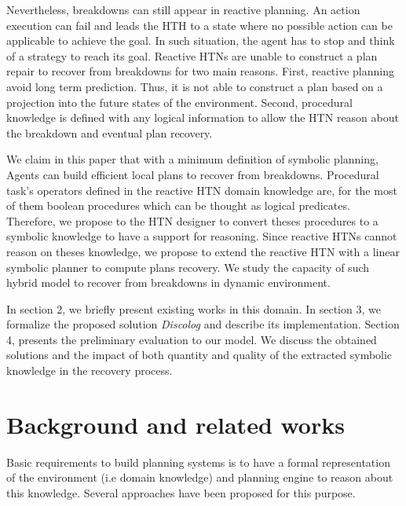 \documentclass[conference]{IEEEtran}
\begin{document}
	\par Nevertheless, breakdowns can still appear in reactive planning. An action execution can fail and leads the HTH to a state where no possible action can be applicable to achieve the goal. 	In such situation, the agent has to stop and think of a strategy to reach its goal.
 Reactive HTNs are unable to construct a plan repair to recover from breakdowns for two main reasons. First, reactive planning avoid long term prediction. Thus, it is not able to construct a plan based on a projection into the future states of the environment. Second, procedural knowledge is defined with any logical information to allow the HTN reason about the breakdown and  eventual plan recovery.
	
	\par We claim in this paper that with a minimum definition of symbolic planning, Agents can build efficient local plans to recover from breakdowns. Procedural task's operators defined in the reactive HTN domain knowledge are, for the most of them boolean procedures which can be thought as logical predicates. Therefore, we propose to the HTN designer to convert theses procedures to a symbolic knowledge to have a support for reasoning. Since reactive HTNs cannot reason on theses knowledge, we propose to extend the reactive HTN  with a linear symbolic planner  to compute plans recovery.  We study the capacity of such hybrid model to recover from breakdowns in dynamic environment. 
	
	\par In section 2, we briefly present existing works in this domain. In section 3, we formalize the proposed solution \textit{Discolog} and describe its implementation. Section 4, presents the preliminary evaluation to our model. We discuss the obtained solutions and the impact of both quantity and quality of the extracted symbolic knowledge in the recovery process. 
	
	\section{Background and related works}
	Basic requirements to build planning systems is to have a formal representation of the environment (i.e domain knowledge) and planning engine to reason about this knowledge. Several approaches have been proposed for this purpose. 
	
\end{document}

